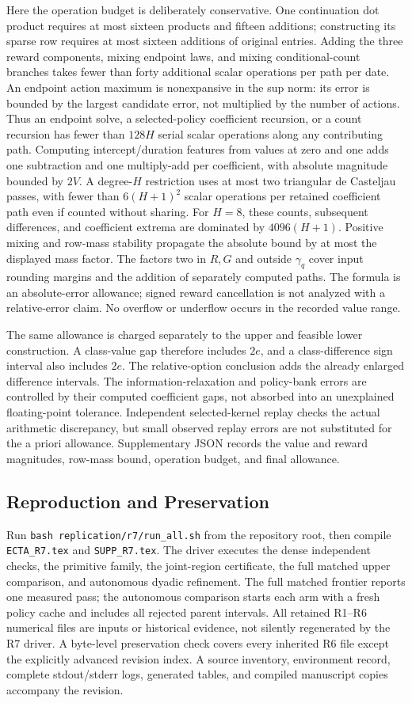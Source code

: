 Here the operation budget is deliberately conservative. One continuation dot product requires at most sixteen products and fifteen additions; constructing its sparse row requires at most sixteen additions of original entries. Adding the three reward components, mixing endpoint laws, and mixing conditional-count branches takes fewer than forty additional scalar operations per path per date. An endpoint action maximum is nonexpansive in the sup norm: its error is bounded by the largest candidate error, not multiplied by the number of actions. Thus an endpoint solve, a selected-policy coefficient recursion, or a count recursion has fewer than $128H$ serial scalar operations along any contributing path. Computing intercept/duration features from values at zero and one adds one subtraction and one multiply-add per coefficient, with absolute magnitude bounded by $2V$. A degree-$H$ restriction uses at most two triangular de Casteljau passes, with fewer than $6(H+1)^2$ scalar operations per retained coefficient path even if counted without sharing. For $H=8$, these counts, subsequent differences, and coefficient extrema are dominated by $4096(H+1)$. Positive mixing and row-mass stability propagate the absolute bound by at most the displayed mass factor. The factors two in $R,G$ and outside $\gamma_q$ cover input rounding margins and the addition of separately computed paths. The formula is an absolute-error allowance; signed reward cancellation is not analyzed with a relative-error claim. No overflow or underflow occurs in the recorded value range.

The same allowance is charged separately to the upper and feasible lower construction. A class-value gap therefore includes $2e$, and a class-difference sign interval also includes $2e$. The relative-option conclusion adds the already enlarged difference intervals. The information-relaxation and policy-bank errors are controlled by their computed coefficient gaps, not absorbed into an unexplained floating-point tolerance. Independent selected-kernel replay checks the actual arithmetic discrepancy, but small observed replay errors are not substituted for the a priori allowance. Supplementary JSON records the value and reward magnitudes, row-mass bound, operation budget, and final allowance.

\subsection{Reproduction and Preservation}
Run \texttt{bash replication/r7/run\_all.sh} from the repository root, then compile \texttt{ECTA\_R7.tex} and \texttt{SUPP\_R7.tex}. The driver executes the dense independent checks, the primitive family, the joint-region certificate, the full matched upper comparison, and autonomous dyadic refinement. The full matched frontier reports one measured pass; the autonomous comparison starts each arm with a fresh policy cache and includes all rejected parent intervals. All retained R1--R6 numerical files are inputs or historical evidence, not silently regenerated by the R7 driver. A byte-level preservation check covers every inherited R6 file except the explicitly advanced revision index. A source inventory, environment record, complete stdout/stderr logs, generated tables, and compiled manuscript copies accompany the revision.
